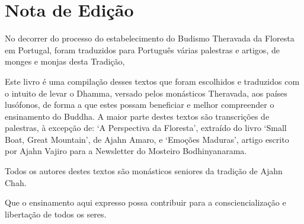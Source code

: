 \chapter{Nota de Edição}

No decorrer do processo do estabelecimento do Budismo Theravada da
Floresta em Portugal, foram traduzidos para Português várias palestras e
artigos, de monges e monjas desta Tradição,

Este livro é uma compilação desses textos que foram escolhidos e
traduzidos com o intuito de levar o Dhamma, versado pelos monásticos
Theravada, aos países lusófonos, de forma a que estes possam beneficiar
e melhor compreender o ensinamento do Buddha. A maior parte destes
textos são transcrições de palestras, à excepção de: ‘A Perspectiva da
Floresta', extraído do livro ‘Small Boat, Great Mountain', de Ajahn
Amaro, e ‘Emoções Maduras', artigo escrito por Ajahn Vajiro para a
Newsletter do Mosteiro Bodhinyanarama.

Todos os autores destes textos são monásticos seniores da tradição de
Ajahn Chah.

Que o ensinamento aqui expresso possa contribuir para a
consciencialização e libertação de todos os seres.

